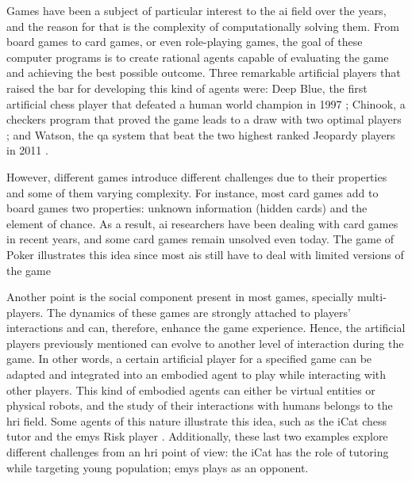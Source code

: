 \label{chapter:introduction}

Games have been a subject of particular interest to the \ac{ai} field over the years, and the reason for that is the complexity of computationally solving them.
From board games to card games, or even role-playing games, the goal of these computer programs is to create rational agents capable of evaluating the game and achieving the best possible outcome.
Three remarkable artificial players that raised the bar for developing this kind of agents were: Deep Blue, the first artificial chess player that defeated a human world champion in 1997 \cite{Campbell2002}; Chinook, a checkers program that proved the game leads to a draw with two optimal players \cite{Schaeffer1996}; and Watson, the \ac{qa} system that beat the two highest ranked Jeopardy players in 2011 \cite{Ferrucci2010}.

However, different games introduce different challenges due to their properties and some of them varying complexity.
For instance, most card games add to board games two properties: unknown information (hidden cards) and the element of chance.
As a result, \ac{ai} researchers have been dealing with card games in recent years, and some card games remain unsolved even today.
The game of Poker illustrates this idea since most \acp{ai} still have to deal with limited versions of the game\cite{Zinkevich}

Another point is the social component present in most games, specially multi-players.
The dynamics of these games are strongly attached to players' interactions and can, therefore, enhance the game experience.
Hence, the artificial players previously mentioned can evolve to another level of interaction during the game.
In other words, a certain artificial player for a specified game can be adapted and integrated into an embodied agent to play while interacting with other players.
This kind of embodied agents can either be virtual entities or physical robots, and the study of their interactions with humans belongs to the \ac{hri} field.
Some agents of this nature illustrate this idea, such as the iCat chess tutor \cite{Affective2007} and the \ac{emys} Risk player \cite{Pereira}.
Additionally, these last two examples explore different challenges from an \ac{hri} point of view: the iCat has the role of tutoring while targeting young population; \ac{emys} plays as an opponent.


